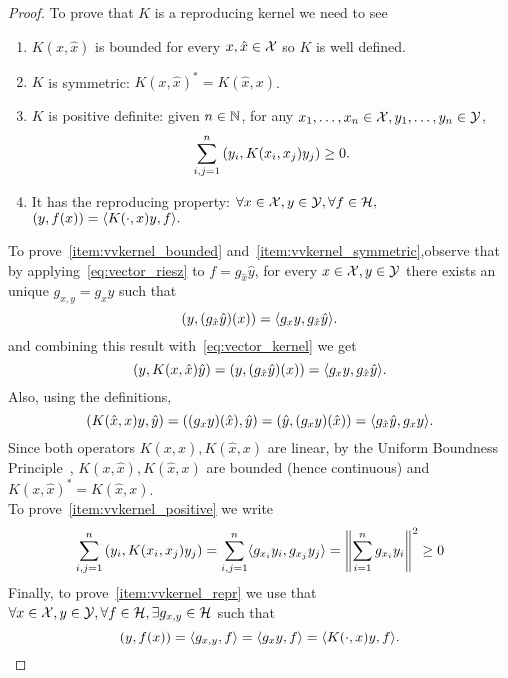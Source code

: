 \begin{proof}
    To prove that $K$ is a reproducing kernel we need to see
    \begin{enumerate}
        \item\label{item:vvkernel_bounded} $K(x, \hat{x})$ is bounded for every $x, \hat{x} \in \mathcal{X}$ so $K$ is well defined.
        \item\label{item:vvkernel_symmetric} $K$ is symmetric: $K(x, \hat{x})^* = K(\hat{x}, x)$.
        \item\label{item:vvkernel_positive}  $K$ is positive definite: given $n \in \mathbb{N}$, for any  $x_1, \ldots, x_n \in \mathcal{X},  y_1, \ldots, y_n \in \mathcal{Y}$,
        \begin{equation}
            \nonumber
            \sum_{i, j =1}^n \left( y_i, K(x_i, x_j) y_j \right) \geq 0.
        \end{equation}
        \item\label{item:vvkernel_repr} It has the reproducing property: $\forall x \in \mathcal{X}, y \in \mathcal{Y}, \forall f \in \mathcal{H},$ $ \left( y, f(x) \right) = \langle K(\cdot, x) y, f \rangle.$
    \end{enumerate}
    To prove~\ref{item:vvkernel_bounded} and~\ref{item:vvkernel_symmetric},observe that by
    applying~\eqref{eq:vector_riesz} to $f = g_{\hat{x}}\hat{y}$, for every $x \in \mathcal{X}, y \in \mathcal{Y}$ there exists an unique $g_{x, y} = g_{x}y$ such that
    \begin{equation}
        \left( y, (g_{\hat{x}} \hat{y}) (x) \right) = \langle g_{x}y, g_{\hat{x}}\hat{y} \rangle .
    \end{equation}
    and combining this result with~\eqref{eq:vector_kernel} we get
    \begin{equation}
        \nonumber
        \left( y, K(x, \hat{x}) \hat{y} \right) = \left( y, (g_{\hat{x}} \hat{y})(x)  \right)= \langle g_{x}y, g_{\hat{x}}\hat{y} \rangle.
    \end{equation}
    Also, using the definitions,
    \begin{equation}
        \nonumber
        \left( K(\hat{x}, x) y,  \hat{y} \right) = \left( (g_{x} y)(\hat{x}), \hat{y} \right) = \left( \hat{y}, (g_{x} y)(\hat{x}) \right) = \langle g_{\hat{x}} \hat{y}, g_x y \rangle.
    \end{equation}
    Since both operators $K(x, \hat{x}), K(\hat{x}, x)$ are linear, by the Uniform Boundness Principle~\cite{Akhiezer1961TheoryOL}, $K(x, \hat{x}), K(\hat{x}, x)$ are bounded (hence continuous) and $K(x, \hat{x})^* = K(\hat{x}, x)$.
    \\
    To prove~\ref{item:vvkernel_positive} we write
    \begin{equation}
        \nonumber
        \sum_{i, j =1}^n \left( y_i, K(x_i, x_j) y_j \right) = \sum_{i, j =1}^n \langle g_{x_i} y_i, g_{x_j} y_j \rangle  = \left\lVert\sum_{i=1}^n g_{x_i} y_i\right\rVert^2 \geq 0
    \end{equation}
    Finally, to prove~\ref{item:vvkernel_repr} we use that 
    $\forall x \in \mathcal{X}, y \in \mathcal{Y}, \forall f \in \mathcal{H}, \exists g_{x, y} \in \mathcal{H}$ such that 
    $$ \left( y, f(x) \right) = \langle g_{x, y}, f \rangle = \langle g_{x} y, f \rangle =\langle K(\cdot, x) y, f \rangle.$$
\end{proof}
